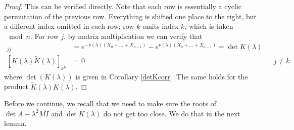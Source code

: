 \documentclass[thesis.tex]{subfiles}
\begin{document}
\begin{lemma}
\begin{proof}
This can be verified directly. Note that each row is essentially a cyclic permutation of the previous row. Everything is shifted one place to the right, but a different index omitted in each row; row $k$ omits index $k$, which is taken $\mod n$. For row $j$, by matrix multiplication we can verify that
\begin{align*}
[K(\lambda)\tilde{K}(\lambda)]_{jj} &= e^{-\nu(\lambda)(X_0 + \dots + X_{n-1})} - e^{\nu(\lambda)(X_0 + \dots + X_{n-1})} = \det K(\lambda) \\
[K(\lambda)\tilde{K}(\lambda)]_{jk} &= 0 && j \neq k
\end{align*}
where $\det(K(\lambda))$ is given in Corollary \ref{detKcorr}. The same holds for the product $\tilde{K}(\lambda)K(\lambda)$.
\end{proof}
\end{lemma}

Before we continue, we recall that we need to make sure the roots of $\det A - \lambda^2 M I$ and $\det K(\lambda)$ do not get too close. We do that in the next lemma.

\end{document}
